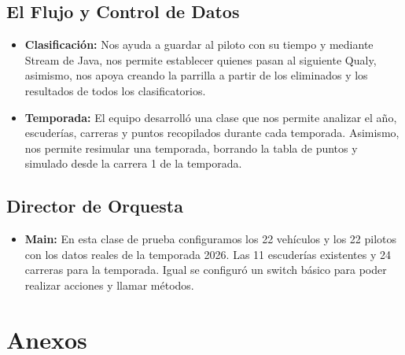 \documentclass[12pt,a4paper]{article}
\begin{document}
\subsection{El Flujo y Control de Datos}
\begin{itemize}
    \item \textbf{Clasificación:} Nos ayuda a guardar al piloto con su tiempo y mediante Stream de Java, nos permite establecer quienes pasan al siguiente Qualy, asimismo, nos apoya creando la parrilla a partir de los eliminados y los resultados de todos los clasificatorios.
    \item \textbf{Temporada:} El equipo desarrolló una clase que nos permite analizar el año, escuderías, carreras y puntos recopilados durante cada temporada. Asimismo, nos permite resimular una temporada, borrando la tabla de puntos y simulado desde la carrera 1 de la temporada.
\end{itemize}

\subsection{Director de Orquesta}
\begin{itemize}
    \item \textbf{Main:} En esta clase de prueba configuramos los 22 vehículos y los 22 pilotos con los datos reales de la temporada 2026. Las 11 escuderías existentes y 24 carreras para la temporada. Igual se configuró un switch básico para poder realizar acciones y llamar métodos.
\end{itemize}

\section{Anexos}
\end{document}

